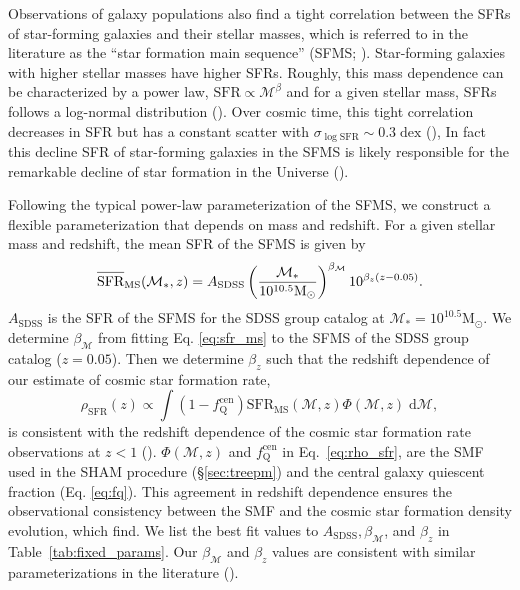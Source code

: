 \documentclass[iop,apj,tighten,twocolappendix,numberedappendix]{emulateapj}
\newcommand{\beq}{\begin{equation}}
\newcommand{\eeq}{\end{equation}}
\newcommand{\avgSFR}{\overline{\raisebox{0pt}[1.2\height]{SFR}}}
\begin{document}
Observations of galaxy populations also find a tight correlation between the SFRs of 
star-forming galaxies and their stellar masses, which is referred 
to in the literature as the ``star formation main sequence'' 
(SFMS; \citealt{Noeske:2007aa, Oliver:2010aa, Karim:2011aa, Moustakas:2013aa}). 
Star-forming galaxies with higher stellar masses have higher SFRs. 
Roughly, this mass dependence can be characterized by a power law, 
$\mathrm{SFR} \propto \mathcal{M}^{\beta}$ and for a given stellar mass, 
SFRs follows a log-normal distribution (\citealt{Noeske:2007aa, Lee:2015aa}). 
Over cosmic time, this tight correlation decreases in SFR but has 
a constant scatter with $\sigma_{\log\mathrm{SFR}} \sim 0.3 \; \mathrm{dex}$ 
(\citealt{Noeske:2007aa, Elbaz:2007aa, Daddi:2007aa, Salim:2007aa, 
Whitaker:2012aa, Lee:2015aa}), In fact this decline SFR of star-forming 
galaxies in the SFMS is likely responsible for the remarkable decline 
of star formation in the Universe (\citealt{Hopkins:2006aa, 
Behroozi:2013aa, Madau:2014aa}).

Following the typical power-law parameterization of the SFMS, we construct a flexible  
parameterization that depends on mass and redshift. For a given stellar mass and 
redshift, the mean SFR of the SFMS is given by 
\beq \label{eq:sfr_ms}
\avgSFR_\mathrm{MS}(\mathcal{M}_*, z) = A_\mathrm{SDSS}
\left(\frac{\mathcal{M}_*}{10^{10.5} \mathrm{M}_\odot} \right)^{\beta_\mathcal{M}}
10^{\beta_z (z - 0.05)}.
\eeq
$A_\mathrm{SDSS}$ is the SFR of the SFMS for the SDSS group catalog at
$\mathcal{M}_* = 10^{10.5} \mathrm{M}_\odot$. We determine 
$\beta_\mathcal{M}$ from fitting Eq. \ref{eq:sfr_ms} to the SFMS of 
the SDSS group catalog ($z = 0.05$). Then we determine $\beta_z$ such 
that the redshift dependence of our estimate of cosmic star formation 
rate,   
\beq \label{eq:rho_sfr}
\rho_\mathrm{SFR}(z) \propto \int \left(1 - f^\mathrm{cen}_\mathrm{Q}\right)
\mathrm{SFR}_\mathrm{MS}(\mathcal{M},z)   
\Phi(\mathcal{M}, z) \; \mathrm{d}\mathcal{M}, 
\eeq
is consistent with the redshift dependence of the cosmic star formation 
rate observations at $z < 1$ (\citealt{Behroozi:2013aa}). 
$\Phi(\mathcal{M},z)$ and $f_\mathrm{Q}^\mathrm{cen}$ in 
Eq.~\ref{eq:rho_sfr}, are the SMF used in the SHAM procedure 
(\S \ref{sec:treepm}) and the central galaxy quiescent fraction 
(Eq. \ref{eq:fq}). 
This agreement in redshift dependence ensures the observational 
consistency between the SMF and the cosmic star formation density 
evolution, which \cite{Behroozi:2013aa} find. 
We list the best fit values to 
$A_\mathrm{SDSS}, \beta_\mathcal{M}$, and $\beta_z$ in 
Table~\ref{tab:fixed_params}. Our $\beta_\mathcal{M}$ and 
$\beta_z$ values are consistent with similar parameterizations in the literature
(\citealt{Salim:2007aa, Moustakas:2013aa, Lee:2015aa}). 
\end{document}
